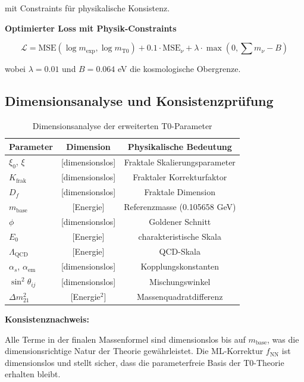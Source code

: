 	mit Constraints für physikalische Konsistenz.
	
	\textbf{Optimierter Loss mit Physik-Constraints}
	
	\begin{equation}
		\mathcal{L} = \text{MSE}(\log m_{\exp}, \log m_{\text{T0}}) + 0.1 \cdot \text{MSE}_{\nu} + \lambda \cdot \max(0, \sum m_{\nu} - B)
	\end{equation}
	
	wobei $\lambda = 0.01$ und $B = 0.064$ eV die kosmologische Obergrenze.
	
	\subsection{Dimensionsanalyse und Konsistenzprüfung}
	
	\begin{table}[h]
		\centering
		\begin{tabular}{lcc}
			\toprule
			\textbf{Parameter} & \textbf{Dimension} & \textbf{Physikalische Bedeutung} \\
			\midrule
			$\xi_0$, $\xi$ & [dimensionslos] & Fraktale Skalierungsparameter \\
			$K_{\text{frak}}$ & [dimensionslos] & Fraktaler Korrekturfaktor \\
			$D_f$ & [dimensionslos] & Fraktale Dimension \\
			$m_{\text{base}}$ & [Energie] & Referenzmasse (0.105658 GeV) \\
			$\phi$ & [dimensionslos] & Goldener Schnitt \\
			$E_0$ & [Energie] & charakteristische Skala \\
			$\Lambda_{\text{QCD}}$ & [Energie] & QCD-Skala \\
			$\alpha_s$, $\alpha_{\text{em}}$ & [dimensionslos] & Kopplungskonstanten \\
			$\sin^2 \theta_{ij}$ & [dimensionslos] & Mischungswinkel \\
			$\Delta m^2_{21}$ & [Energie$^2$] & Massenquadratdifferenz \\
			\bottomrule
		\end{tabular}
		\caption{Dimensionsanalyse der erweiterten T0-Parameter}
		\label{tab:dimensions}
	\end{table}
	
	\textbf{Konsistenznachweis:}
	
	Alle Terme in der finalen Massenformel sind dimensionslos bis auf $m_{\text{base}}$, was die dimensionsrichtige Natur der Theorie gewährleistet. Die ML-Korrektur $f_{\text{NN}}$ ist dimensionslos und stellt sicher, dass die parameterfreie Basis der T0-Theorie erhalten bleibt.
	
